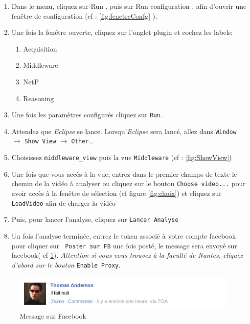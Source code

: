 \begin{enumerate}
 \item Dans le menu, cliquez sur \og Run \fg, puis sur \og Run configuration \fg, 
afin d'ouvrir une fenêtre de configuration (cf : \ref{fig:fenetreConfg} ).
  \item Une fois la fenêtre ouverte, cliquez sur l'onglet plugin et cochez les labels:
  \begin{enumerate}
      \item Acquisition
      \item Middleware
      \item NetP
      \item Reasoning
      \end{enumerate}
      \item Une fois les paramètres configurés cliquez sur \verb+Run+.
      \item Attendez que \emph{Eclipse} se lance. Lorsqu'\emph{Eclipse} sera lancé, allez dans \verb+Window+ $\rightarrow$ \verb+Show View+ $\rightarrow$ \verb+Other+\dots
      \item Choisissez \verb+middleware_view+ puis la vue \verb+Middleware+ (cf : \ref{fig:ShowView})
      \item Une fois que vous accès à la vue, entrez dans le premier champs de texte le chemin de la vidéo à analyser ou cliquez sur le bouton \verb+Choose video...+ pour avoir accès à la fenêtre de sélection (cf figure \ref{fig:choix}) et cliquez sur \verb+LoadVideo+ afin de charger la vidéo
      \item Puis, pour lancer l'analyse, cliquez sur \verb+Lancer Analyse+
      \item Un fois l'analyse terminée, entrez le token associé à votre compte facebook pour cliquer sur \verb+ Poster sur FB+ une fois posté, le message sera envoyé sur facebook( cf \ref{fig:messageFB}). \emph{Attention si vous vous trouvez à la faculté de Nantes, cliquez d'abord sur le bouton} \verb+Enable Proxy+.
  \end{enumerate}
\begin{figure}[h]
	  \centering
	  \includegraphics[scale=0.5]{img/cestlanuit}
	  \caption{Message sur Facebook}
	  \label{fig:messageFB}
\end{figure}
